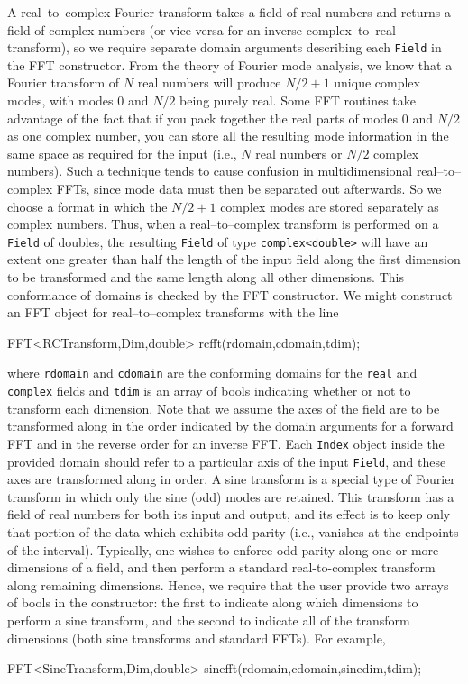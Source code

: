 A real--to--complex Fourier transform takes a field of real numbers and returns a field of complex numbers (or vice-versa for an inverse complex--to--real transform), so we require separate domain arguments describing each \texttt{Field} in the FFT constructor. From the theory of Fourier mode analysis, we know that a Fourier transform of $N$ real numbers will produce $N/2+ 1$ unique complex modes, with modes $0$ and $N/2$ being purely real. Some FFT routines take advantage of the fact that if you pack together the real parts of modes $0$ and $N/2$ as one complex number, you can store all the resulting mode information in the same space as required for the input (i.e., $N$ real numbers or $N/2$ complex numbers). Such a technique tends to cause confusion in multidimensional real--to--complex FFTs, since mode data must then be separated out afterwards. So we choose a format in which the $N/2+ 1$ complex modes are stored separately as complex numbers. Thus, when a real--to--complex transform is performed on a {\tt \texttt{Field}} of doubles, the resulting {\tt \texttt{Field}} of type {\tt complex<double>} will have an extent one greater than half the length of the input field along the first dimension to be transformed and the same length along all other dimensions. This conformance of domains is checked by the FFT constructor. We might construct an FFT object for real--to--complex transforms with the line
\begin{smallcode}
FFT<RCTransform,Dim,double> rcfft(rdomain,cdomain,tdim);
\end{smallcode}
where {\tt rdomain} and {\tt cdomain} are the conforming domains for the {\tt real} and {\tt complex} fields and {\tt tdim} is an array of bools indicating whether or not to transform each dimension. Note that we assume the axes of the field are to be transformed along in the order indicated by the domain arguments for a forward FFT and in the reverse order for an inverse FFT. Each \texttt{Index} object inside the provided domain should refer to a particular axis of the input \texttt{Field}, and these axes are transformed along in order. A sine transform is a special type of Fourier transform in which only the sine (odd) modes are retained. This transform has a field of real numbers for both its input and output, and its effect is to keep only that portion of the data which exhibits odd parity (i.e., vanishes at the endpoints of the interval). Typically, one wishes to enforce odd parity along one or more dimensions of a field, and then perform a standard real-to-complex transform along remaining dimensions. Hence, we require that the user provide two arrays of bools in the constructor: the first to indicate along which dimensions to perform a sine transform, and the second to indicate all of the transform dimensions (both sine transforms and standard FFTs). For example,
\begin{smallcode}
FFT<SineTransform,Dim,double> sinefft(rdomain,cdomain,sinedim,tdim);
\end{smallcode}



